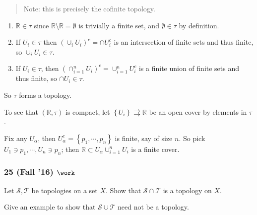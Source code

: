 \begin{solution}

\envlist

\begin{concept}

\envlist

\end{concept}

\begin{quote}
Note: this is precisely the cofinite topology.
\end{quote}

\begin{enumerate}
\def\labelenumi{\arabic{enumi}.}
\tightlist
\item
  \({\mathbb{R}}\in \tau\) since
  \({\mathbb{R}}\setminus {\mathbb{R}}= \emptyset\) is trivially a
  finite set, and \(\emptyset \in \tau\) by definition.
\item
  If \(U_i \in \tau\) then \((\cup_i U_i)^c = \cap U_i^c\) is an
  intersection of finite sets and thus finite, so
  \(\cup_i U_i \in \tau\).
\item
  If \(U_i \in \tau\), then
  \((\cap_{i=1}^n U_i)^c = \cup_{i=1}^n U_i^c\) is a finite union of
  finite sets and thus finite, so \(\cap U_i \in \tau\).
\end{enumerate}

So \(\tau\) forms a topology.

To see that \(({\mathbb{R}}, \tau)\) is compact, let
\(\left\{{U_i}\right\} \rightrightarrows {\mathbb{R}}\) be an open cover
by elements in \(\tau\).

Fix any \(U_\alpha\), then
\(U_\alpha^c = \left\{{p_1, \cdots, p_n}\right\}\) is finite, say of
size \(n\). So pick \(U_1 \ni p_1, \cdots, U_n \ni p_n\); then
\({\mathbb{R}}\subset U_\alpha \cup_{i=1}^n U_i\) is a finite cover.

\end{solution}

\hypertarget{fall-16-work}{%
\subsubsection{\texorpdfstring{25 (Fall '16)
\(\work\)}{25 (Fall '16) \textbackslash work}}\label{fall-16-work}}

\begin{problem}[?]

Let \({\mathcal{S}}, {\mathcal{T}}\) be topologies on a set \(X\). Show
that \({\mathcal{S}}\cap {\mathcal{T}}\) is a topology on \(X\).

Give an example to show that \({\mathcal{S}}\cup {\mathcal{T}}\) need
not be a topology.

\end{problem}

